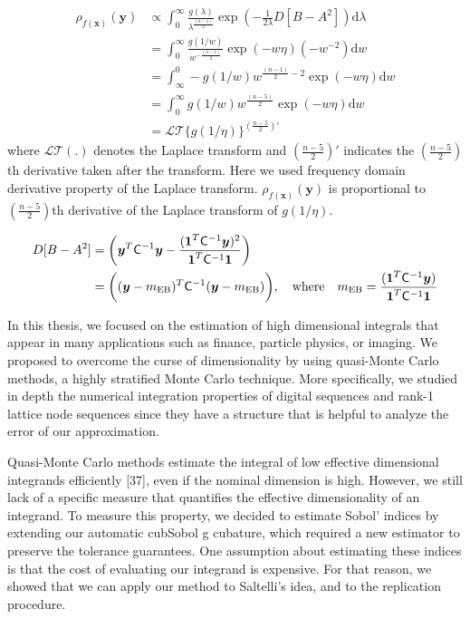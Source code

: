 \documentclass{iitthesis}          %
\newcommand{\bm}[1]{\boldsymbol{#1}}
\newcommand{\dif}[1]{\text{d}{#1}}
\newcommand{\vx}{\bm{x}}
\newcommand{\vy}{\bm{y}}
\newcommand{\vone}{\bm{1}}
\newcommand{\mCInv}{{\mathsf{C}^{-1}}}
\newcommand{\MLE}{\textup{EB}}
\begin{document}
{{{{{{\begin{align*}
\rho_{f(\vx)}(\vy) 
& \propto \int_{0}^\infty \frac{g(\lambda)}{\lambda^{\frac{(n-1)}{2}}}
\exp \left(  - \frac{1}{2\lambda} D [B - A^2] \right)
\dif{\lambda} 
\\
&= \int_{0}^\infty \frac{g(1/w)  }{w^{-\frac{(n-1)}{2}}}
\exp \left(  - w \eta \right)
(-w^{-2})\dif{w}
\\
&= \int_\infty^0 -g(1/w) w^{\frac{(n-1)}{2} - 2}
\exp \left(  - w \eta \right)
\dif{w}
\\
&= \int_{0}^\infty g(1/w) w^{\frac{(n-5)}{2}}
\exp \left(  - w \eta \right)
\dif{w}
\\
& = \mathcal{LT}\{ g(1/\eta) \}^{(\frac{n-5}{2})'}
\end{align*}
where $\mathcal{LT}(.)$ denotes the Laplace transform and $(\frac{n-5}2)'$ indicates the $(\frac{n-5}2)$th derivative taken after the transform.
Here we used frequency domain derivative property of the Laplace transform. 
$\rho_{f(\vx)}(\vy)$  is proportional to $(\frac{n-5}2)$th derivative of the Laplace transform of $g(1/\eta)$.

\begin{align*}
D [B - A^2] &= \left(\vy^T\mCInv\vy - \frac{(\vone^T\mCInv\vy)^2}{\vone^T\mCInv\vone} \right)
\\
&= \biggl((\vy-m_\MLE)^T \mCInv (\vy-m_\MLE) \biggr), 
\quad \text{where} \quad
m_\MLE=\frac{(\vone^T \mCInv \vy)}{\vone^T\mCInv\vone}
\end{align*}
\fi










\iffalse
In this thesis, we focused on the estimation of high dimensional integrals that
appear in many applications such as finance, particle physics, or imaging. We proposed
to overcome the curse of dimensionality by using quasi-Monte Carlo methods,
a highly stratified Monte Carlo technique. More specifically, we studied in depth the
numerical integration properties of digital sequences and rank-1 lattice node sequences
since they have a structure that is helpful to analyze the error of our approximation.

Quasi-Monte Carlo methods estimate the integral of low effective dimensional
integrands efficiently [37], even if the nominal dimension is high. However, we still
lack of a specific measure that quantifies the effective dimensionality of an integrand.
To measure this property, we decided to estimate Sobol’ indices by extending our
automatic cubSobol g cubature, which required a new estimator to preserve the
tolerance guarantees. One assumption about estimating these indices is that the cost
of evaluating our integrand is expensive. For that reason, we showed that we can
apply our method to Saltelli’s idea, and to the replication procedure.

}}}}}}
\end{document}
